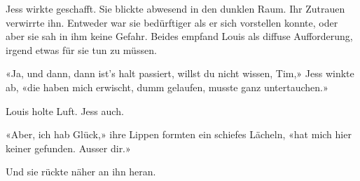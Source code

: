 Jess wirkte geschafft. Sie blickte abwesend in den dunklen Raum.
Ihr Zutrauen verwirrte ihn. Entweder war sie bedürftiger als er sich
vorstellen konnte, oder aber sie sah in ihm keine Gefahr.
Beides empfand Louis als diffuse Aufforderung, irgend
etwas für sie tun zu müssen.

«Ja, und dann, dann ist’s halt passiert, willst du nicht wissen, Tim,»
Jess winkte ab, «die haben mich erwischt, dumm gelaufen, musste ganz
untertauchen.»

Louis holte Luft. Jess auch.

«Aber, ich hab Glück,» ihre Lippen formten ein schiefes Lächeln, «hat
mich hier keiner gefunden. Ausser dir.»

Und sie rückte näher an ihn heran.
